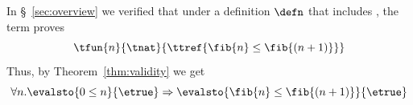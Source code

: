 


%
In \S~\ref{sec:overview} we verified that
under a definition $\defn$ that includes \fibname,
the term \fibincrname proves
$${\tfun{n}{\tnat}{\ttref{\fib{n} \leq \fib{(n+1)}}}}$$
%
Thus, by Theorem~\ref{thm:validity} we get
%
$$
\forall n. \evalsto{0 \leq n}{\etrue} \Rightarrow \evalsto{\fib{n} \leq \fib{(n+1)}}{\etrue}
$$